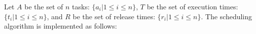 \documentclass[11pt]{article}
\begin{document}
\begin{enumerate}
\begin{enumerate}
Let $A$ be the set of $n$ tasks: $\{a_i | 1 \leq i \leq n\}$, $T$ be
the set of execution times: $\{t_i | 1 \leq i \leq n\}$, and $R$ be the 
set of release times: $\{r_i | 1 \leq i \leq n\}$. The scheduling
algorithm is implemented as
follows:\\\\\\\\\\\\\\\\\\\\\\\\\\\\\\\\\\\\\\\\\\\\\\\\\\\\


\end{enumerate}
\end{enumerate}
\end{document}
